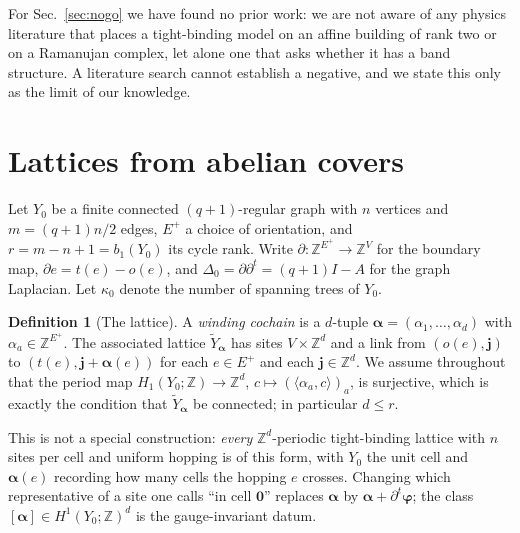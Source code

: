\documentclass[aps,prb,reprint,amsmath,amssymb,floatfix,superscriptaddress]{revtex4-2}
\theoremstyle{plain}
\theoremstyle{definition}
\newtheorem{definition}[theorem]{Definition}
\theoremstyle{remark}
\newcommand{\Z}{\mathbb{Z}}
\newcommand{\Yt}{\widetilde Y_{\bm\alpha}}
\begin{document}
For Sec.~\ref{sec:nogo} we have found no prior work: we are not aware of any physics
literature that places a tight-binding model on an affine building of rank two or on a
Ramanujan complex, let alone one that asks whether it has a band structure. A literature
search cannot establish a negative, and we state this only as the limit of our knowledge.

\section{Lattices from abelian covers}\label{sec:setup}

Let $Y_0$ be a finite connected $(q{+}1)$-regular graph with $n$ vertices and
$m=(q{+}1)n/2$ edges, $E^{+}$ a choice of orientation, and $r=m-n+1=b_1(Y_0)$ its cycle
rank. Write $\partial\colon\Z^{E^{+}}\to\Z^{V}$ for the boundary map, $\partial
e=t(e)-o(e)$, and $\Delta_0=\partial\partial^{t}=(q{+}1)I-A$ for the graph Laplacian.
Let $\kappa_0$ denote the number of spanning trees of $Y_0$.

\begin{definition}[The lattice]\label{def:lattice}
A \emph{winding cochain} is a $d$-tuple $\bm\alpha=(\alpha_1,\dots,\alpha_d)$ with
$\alpha_a\in\Z^{E^{+}}$. The associated lattice $\Yt$ has sites $V\times\Z^{d}$ and a link
from $(o(e),\bm j)$ to $(t(e),\bm j+\bm\alpha(e))$ for each $e\in E^{+}$ and each
$\bm j\in\Z^{d}$. We assume throughout that the period map
$H_1(Y_0;\Z)\to\Z^{d}$, $c\mapsto(\langle\alpha_a,c\rangle)_a$, is surjective, which is
exactly the condition that $\Yt$ be connected; in particular $d\le r$.
\end{definition}

This is not a special construction: \emph{every} $\Z^{d}$-periodic tight-binding lattice
with $n$ sites per cell and uniform hopping is of this form, with $Y_0$ the unit cell and
$\bm\alpha(e)$ recording how many cells the hopping $e$ crosses. Changing which
representative of a site one calls ``in cell $\bm 0$'' replaces $\bm\alpha$ by
$\bm\alpha+\partial^{t}\bm\varphi$; the class $[\bm\alpha]\in H^{1}(Y_0;\Z)^{d}$ is the
gauge-invariant datum.
\end{document}
